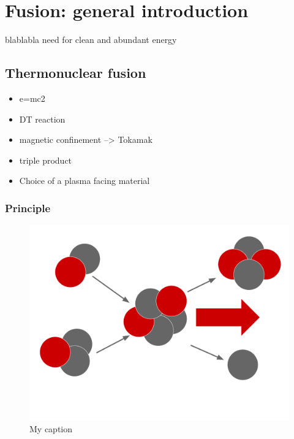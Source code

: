 \setchapterpreamble[u]{\margintoc}
\chapter{Fusion: general introduction}\label{Chapter1}

blablabla need for clean and abundant energy

\section{Thermonuclear fusion}
\begin{itemize}
    \item e=mc2
    \item DT reaction
    \item magnetic confinement --> Tokamak
    \item triple product
    \item Choice of a plasma facing material
\end{itemize}

\subsection{Principle}

\begin{figure} [h]
    \centering
    \includegraphics[width=\linewidth]{Figures/Chapter1/nuc_fus.pdf}
    \caption{My caption}
\end{figure}


